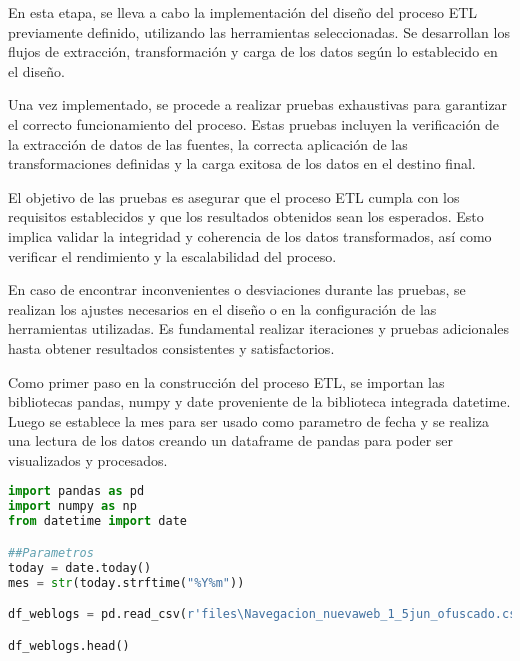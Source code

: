 En esta etapa, se lleva a cabo la implementación del diseño del proceso ETL previamente definido, utilizando las herramientas seleccionadas. Se desarrollan los flujos de extracción, transformación y carga de los datos según lo establecido en el diseño.

Una vez implementado, se procede a realizar pruebas exhaustivas para garantizar el correcto funcionamiento del proceso. Estas pruebas incluyen la verificación de la extracción de datos de las fuentes, la correcta aplicación de las transformaciones definidas y la carga exitosa de los datos en el destino final.

El objetivo de las pruebas es asegurar que el proceso ETL cumpla con los requisitos establecidos y que los resultados obtenidos sean los esperados. Esto implica validar la integridad y coherencia de los datos transformados, así como verificar el rendimiento y la escalabilidad del proceso.

En caso de encontrar inconvenientes o desviaciones durante las pruebas, se realizan los ajustes necesarios en el diseño o en la configuración de las herramientas utilizadas. Es fundamental realizar iteraciones y pruebas adicionales hasta obtener resultados consistentes y satisfactorios.

Como primer paso en la construcción del proceso ETL, se importan las bibliotecas pandas, numpy y date proveniente de la biblioteca integrada datetime. Luego se establece la mes para ser usado como parametro de fecha y se realiza una lectura de los datos creando un dataframe de pandas para poder ser visualizados y procesados.

\begin{lstlisting}[language=Python]
import pandas as pd
import numpy as np
from datetime import date

##Parametros 
today = date.today()
mes = str(today.strftime("%Y%m"))

df_weblogs = pd.read_csv(r'files\Navegacion_nuevaweb_1_5jun_ofuscado.csv')

df_weblogs.head()
\end{lstlisting}
